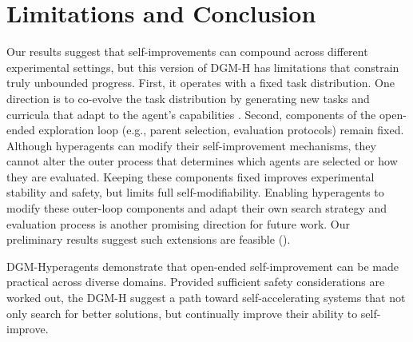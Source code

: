 \documentclass{article}
\begin{document}
\vspace{-0.5em}
\section{Limitations and Conclusion}
\label{sec:conclusion}
\vspace{-0.5em}


Our results suggest that self-improvements can compound across different experimental settings, but this version of DGM-H has limitations that constrain truly unbounded progress.
First, it operates with a fixed task distribution. One direction is to co-evolve the task distribution by generating new tasks and curricula that adapt to the agent's capabilities \citep{clune2019ai, zhangomni, faldoromni, bolton2025sima}.
Second, components of the open-ended exploration loop (e.g., parent selection, evaluation protocols) remain fixed. Although hyperagents can modify their self-improvement mechanisms, they cannot alter the outer process that determines which agents are selected or how they are evaluated. Keeping these components fixed improves experimental stability and safety, but limits full self-modifiability. Enabling hyperagents to modify these outer-loop components and adapt their own search strategy and evaluation process is another promising direction for future work. Our preliminary results suggest such extensions are feasible ().

DGM-Hyperagents demonstrate that open-ended self-improvement can be made practical across diverse domains. Provided sufficient safety considerations are worked out, the DGM-H suggest a path toward self-accelerating systems that not only search for better solutions, but continually improve their ability to self-improve.
\end{document}
